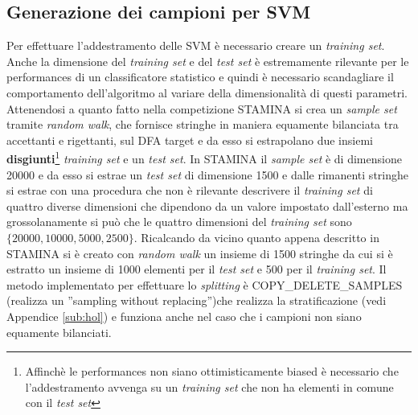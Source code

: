 \subsection{Generazione dei campioni per SVM}
Per effettuare l'addestramento delle \ac{SVM} è necessario creare un \textit{training set}. Anche la dimensione del \textit{training set} e del \textit{test set} è estremamente rilevante per le performances di un classificatore statistico e quindi è necessario scandagliare il comportamento dell'algoritmo al variare della dimensionalità di questi parametri. Attenendosi a quanto fatto nella competizione STAMINA \cite{Stamina10} si crea un \textit{sample set} tramite \textit{random walk}, che fornisce stringhe in maniera equamente bilanciata tra accettanti e rigettanti, sul \ac{DFA} target e da esso si estrapolano due insiemi \textbf{disgiunti}\footnote{Affinchè le performances non siano ottimisticamente biased è necessario che l'addestramento avvenga su un \textit{training set} che non ha elementi in comune con il \textit{test set}} \textit{training set} e un \textit{test set}. In STAMINA il \textit{sample set} è di dimensione 20000 e da esso si estrae un \textit{test set} di dimensione 1500 e dalle rimanenti stringhe si estrae con una procedura che non è rilevante descrivere il \textit{training set} di quattro diverse dimensioni che dipendono da un valore impostato dall'esterno ma grossolanamente si può che le quattro dimensioni del \textit{training set} sono $\{20000,10000,5000,2500\}$. Ricalcando da vicino quanto appena descritto in STAMINA si è creato con \textit{random walk} un insieme di 1500 stringhe da cui si è estratto un insieme di 1000 elementi per il \textit{test set} e 500 per il \textit{training set}. Il metodo implementato per effettuare lo \textit{splitting} è COPY\_DELETE\_SAMPLES (realizza un ''sampling without replacing'')che realizza la stratificazione (vedi Appendice \ref{sub:hol}) e funziona anche nel caso che i campioni non siano equamente bilanciati.
